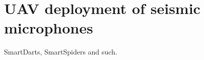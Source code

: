 \chapter[UAV deploying Smartdarts]{UAV deployment of seismic microphones}

SmartDarts, SmartSpiders and such.
%
%
%

%

%

%

%

%

%
%
%
%
%
%
%
%
